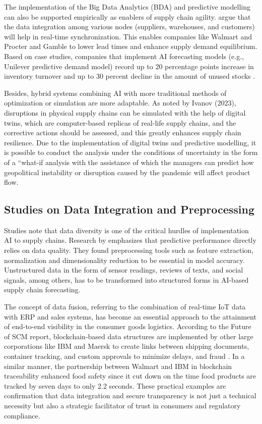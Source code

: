 The implementation of the Big Data Analytics (BDA) and predictive modelling can also be supported empirically as enablers of supply chain agility. \autocite{kache2017challenges} argue that the data integration among various nodes (suppliers, warehouses, and customers) will help in real-time synchronization. This enables companies like Walmart and Procter and Gamble to lower lead times and enhance supply demand equilibrium. Based on case studies, companies that implement AI forecasting models (e.g., Unilever predictive demand model) record up to 20 percentage points increase in inventory turnover and up to 30 percent decline in the amount of unused stocks \autocite{Min2022BigDataAI}.

Besides, hybrid systems combining AI with more traditional methods of optimization or simulation are more adaptable. As noted by Ivanov (2023)\autocite{IVANOV2023108938}, disruptions in physical supply chains can be simulated with the help of digital twins, which are computer-based replicas of real-life supply chains, and the corrective actions should be assessed, and this greatly enhances supply chain resilience. Due to the implementation of digital twins and predictive modelling, it is possible to conduct the analysis under the conditions of uncertainty in the form of a “what-if analysis with the assistance of which the managers can predict how geopolitical instability or disruption caused by the pandemic will affect product flow.


\subsection{Studies on Data Integration and Preprocessing}

Studies note that data diversity is one of the critical hurdles of implementation AI to supply chains. Research by \autocite{Jahin_2024} emphasizes that predictive performance directly relies on data quality. They found preprocessing tools such as feature extraction, normalization and dimensionality reduction to be essential in model accuracy. Unstructured data in the form of sensor readings, reviews of texts, and social signals, among others, has to be transformed into structured forms in AI-based supply chain forecasting.

The concept of data fusion, referring to the combination of real-time IoT data with ERP and sales systems, has become an essential approach to the attainment of end-to-end visibility in the consumer goods logistics. According to the Future of SCM report, blockchain-based data structures are implemented by other large corporations like IBM and Maersk to create links between shipping documents, container tracking, and custom approvals to minimize delays, and fraud \autocite{fi11070161}. In a similar manner, the partnership between Walmart and IBM in blockchain traceability enhanced food safety since it cut down on the time food products are tracked by seven days to only 2.2 seconds. These practical examples are confirmation that data integration and secure transparency is not just a technical necessity but also a strategic facilitator of trust in consumers and regulatory compliance.


